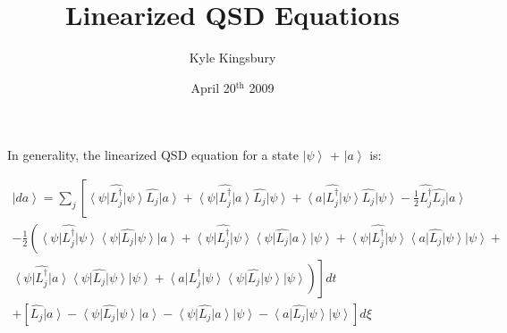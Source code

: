 \documentclass[11pt,letterpaper]{article}
\title{Linearized QSD Equations}
\author{Kyle Kingsbury}
\date{April 20$^{\mathrm{th}}$ 2009}
\newcommand{\bra}[1]{\ensuremath{\left\langle{}#1\right|}}
\newcommand{\ket}[1]{\ensuremath{\left|#1\right\rangle}}
\newcommand{\blk}[2]{\bra{#1}\lo\ket{#2}}
\newcommand{\bltk}[2]{\bra{#1}\lot\ket{#2}}
\newcommand{\lo}{\ensuremath{\hat{L_j}}}
\newcommand{\lot}{\ensuremath{\hat{L_j^\dagger}}}
\begin{document}
\maketitle

In generality, the linearized QSD equation for a state \ket{\psi} + \ket{a} is:

\small

\begin{multline}
\ket{da} =
\sum_j \left[
  \bltk{\psi}{\psi}\lo\ket{a} + \bltk{\psi}{a}\lo\ket{\psi} + \bltk{a}{\psi}\lo\ket{\psi} \right.
  -\frac{1}{2}\lot\lo\ket{a} \\
  -\frac{1}{2}\left(
    \bltk{\psi}{\psi}\blk{\psi}{\psi}\ket{a} +
    \bltk{\psi}{\psi}\blk{\psi}{a}\ket{\psi} +
    \bltk{\psi}{\psi}\blk{a}{\psi}\ket{\psi} + \right. \\ \left. \left.
    \bltk{\psi}{a}\blk{\psi}{\psi}\ket{\psi} +
    \bltk{a}{\psi}\blk{\psi}{\psi}\ket{\psi}
  \right)
\right] dt \\
+ \left[
\lo\ket{a} - 
\blk{\psi}{\psi}\ket{a} - 
\blk{\psi}{a}\ket{\psi} - 
\blk{a}{\psi}\ket{\psi}
\right] d\xi
\end{multline}
\end{document}
